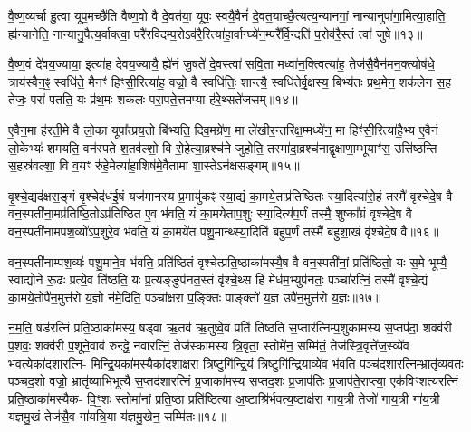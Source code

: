 {\anuvakamend[{अथ॑ ददते॒ स्वया॒ सन्थ्स्व॑धाका॒रो हि वि॑न्दति॥२॥}]}

वै॒ष्ण॒व्यर्चा हु॒त्वा यूप॒मच्छै॑ति वैष्ण॒वो वै दे॒वत॑या॒ यूपः॒ स्वयै॒वैनं॑ दे॒वत॒याच्छै॒त्यत्य॒न्यानगां॒ नान्यानुपा॑गा॒मित्या॒हाति॒ ह्य॑न्यानेति॒ नान्यानु॒पैत्य॒र्वाक्त्वा॒ परै॑रविदम्प॒रो\-ऽव॑रै॒रित्या॑हा॒र्वाग्घ्ये॑न॒म्परै᳚र्वि॒न्दति॑ प॒रोव॑रै॒स्तं त्वा॑ जुषे॥१३॥

वै॒ष्ण॒वं दे॑वय॒ज्याया॒ इत्या॑ह देवय॒ज्यायै॒ ह्ये॑नं जु॒षते॑ दे॒वस्त्वा॑ सवि॒ता मध्वा॑न॒क्त्वित्या॑ह॒ तेज॑सै॒वैन॑मन॒क्त्योष॑धे॒ त्राय॑स्वैन॒ꣴ॒ स्वधि॑ते॒ मैनꣳ॑ हिꣳसी॒रित्या॑ह॒ वज्रो॒ वै स्वधि॑तिः॒ शान्त्यै॒ स्वधि॑तेर्वृ॒क्षस्य॒ बिभ्य॑तः प्रथ॒मेन॒ शक॑लेन स॒ह तेजः॒ परा॑ पतति॒ यः प्र॑थ॒मः शक॑लः परा॒पते॒त्तमप्या ह॑रे॒थ्सते॑जसम्॥१४॥

ए॒वैन॒मा ह॑रती॒मे वै लो॒का यूपा᳚त्प्रय॒तो बि॑भ्यति॒ दिव॒मग्रे॑ण॒ मा ले॑खीर॒न्तरि॑क्ष॒म्मध्ये॑न॒ मा हिꣳ॑सी॒रित्या॑है॒भ्य ए॒वैनं॑ लो॒केभ्यः॑ शमयति॒ वन॑स्पते श॒तव॑ल्\mbox{}शो॒ वि रो॒हेत्या॒व्रश्च॑ने जुहोति॒ तस्मा॑दा॒व्रश्च॑नाद्वृ॒क्षाणा॒म्भूयाꣳ॑स॒ उत्ति॑ष्ठन्ति स॒हस्र॑वल्\mbox{}शा॒ वि व॒यꣳ रु॑हे॒मेत्या॑हा॒शिष॑मे॒वैतामा शा॒स्ते\-ऽन॑क्षसङ्गम्॥१५॥

वृ॒श्चे॒द्यद॑क्षस॒ङ्गं वृ॒श्चेद॑धई॒षं यज॑मानस्य प्र॒मायु॑कꣴ स्या॒द्यं का॒मये॒ताप्र॑तिष्ठितः स्या॒दित्या॑रो॒हं तस्मै॑ वृश्चेदे॒ष वै वन॒स्पती॑ना॒मप्र॑तिष्ठि॒तो\-ऽप्र॑तिष्ठित ए॒व भ॑वति॒ यं का॒मये॑ताप॒शुः स्या॒दित्य॑प॒र्णं तस्मै॒ शुष्का᳚ग्रं वृश्चेदे॒ष वै वन॒स्पती॑नामपश॒व्यो॑\-ऽप॒शुरे॒व भ॑वति॒ यं का॒मये॑त पशु॒मान्थ्स्या॒दिति॑ बहुप॒र्णं तस्मै॑ बहुशा॒खं वृ॑श्चेदे॒ष वै॥१६॥

वन॒स्पती॑नाम्पश॒व्यः॑ पशु॒माने॒व भ॑वति॒ प्रति॑ष्ठितं वृश्चेत्प्रति॒ष्ठाका॑मस्यै॒ष वै वन॒स्पती॑नां॒ प्रति॑ष्ठितो॒ यः स॒मे भूम्यै॒ स्वाद्योने॑ रू॒ढः प्रत्ये॒व ति॑ष्ठति॒ यः प्र॒त्यङ्ङुप॑नत॒स्तं वृ॑श्चे॒थ्स हि मेध॑म॒भ्युप॑नतः॒ पञ्चा॑रत्निं॒ तस्मै॑ वृश्चे॒द्यं का॒मये॒तोपै॑न॒मुत्त॑रो य॒ज्ञो न॑मे॒दिति॒ पञ्चा᳚क्षरा प॒ङ्क्तिः पाङ्क्तो॑ य॒ज्ञ उपै॑न॒मुत्त॑रो य॒ज्ञः॥१७॥

न॒म॒ति॒ षड॑रत्निं प्रति॒ष्ठाका॑मस्य॒ षड्वा ऋ॒तव॑ ऋ॒तुष्वे॒व प्रति॑ तिष्ठति स॒प्तार॑त्निम्प॒शुका॑मस्य स॒प्तप॑दा॒ शक्व॑री प॒शवः॒ शक्व॑री प॒शूने॒वाव॑ रुन्द्धे॒ नवा॑रत्निं॒ तेज॑स्कामस्य त्रि॒वृता॒ स्तोमे॑न॒ सम्मि॑तं॒ तेज॑स्त्रि॒वृत्ते॑ज॒स्व्ये॑व भ॑व॒त्येका॑दशारत्नि- मिन्द्रि॒यका॑म॒स्यैका॑दशाक्षरा त्रि॒ष्टुगि॑न्द्रि॒यं त्रि॒ष्टुगि॑न्द्रिया॒व्ये॑व भ॑वति॒ पञ्च॑दशारत्नि॒म्भ्रातृ॑व्यवतः पञ्चद॒शो वज्रो॒ भ्रातृ॑व्याभिभूत्यै स॒प्तद॑शारत्निं प्र॒जाका॑मस्य सप्तद॒शः प्र॒जाप॑तिः प्र॒जाप॑ते॒राप्त्या॒ एक॑विꣳशत्यरत्निं प्रति॒ष्ठाका॑मस्यैक- वि॒ꣳ॒शः स्तोमा॑नां प्रति॒ष्ठा प्रति॑ष्ठित्या अ॒ष्टाश्रि॑र्भवत्य॒ष्टाक्ष॑रा गाय॒त्री तेजो॑ गाय॒त्री गा॑य॒त्री य॑ज्ञमु॒खं तेज॑सै॒व गा॑यत्रि॒या य॑ज्ञमु॒खेन॒ सम्मि॑तः॥१८॥

